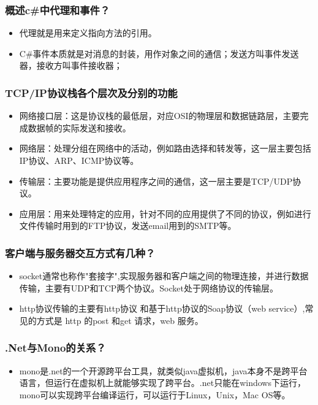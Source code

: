 \documentclass[9pt, b5paper]{article}
\begin{document}
\subsubsection{概述c\#中代理和事件？}
\label{sec:org9d51254}
\begin{itemize}
\item 代理就是用来定义指向方法的引用。
\item C\#事件本质就是对消息的封装，用作对象之间的通信；发送方叫事件发送器，接收方叫事件接收器；
\end{itemize}

\subsubsection{TCP/IP协议栈各个层次及分别的功能}
\label{sec:org0fd1e18}
\begin{itemize}
\item 网络接口层：这是协议栈的最低层，对应OSI的物理层和数据链路层，主要完成数据帧的实际发送和接收。
\item 网络层：处理分组在网络中的活动，例如路由选择和转发等，这一层主要包括IP协议、ARP、ICMP协议等。
\item 传输层：主要功能是提供应用程序之间的通信，这一层主要是TCP/UDP协议。
\item 应用层：用来处理特定的应用，针对不同的应用提供了不同的协议，例如进行文件传输时用到的FTP协议，发送email用到的SMTP等。
\end{itemize}

\subsubsection{客户端与服务器交互方式有几种？}
\label{sec:org80db452}
\begin{itemize}
\item socket通常也称作"套接字",实现服务器和客户端之间的物理连接，并进行数据传输，主要有UDP和TCP两个协议。Socket处于网络协议的传输层。
\item http协议传输的主要有http协议 和基于http协议的Soap协议（web service）,常见的方式是 http 的post 和get 请求，web 服务。
\end{itemize}

\subsubsection{.Net与Mono的关系？}
\label{sec:org9f5bc1f}
\begin{itemize}
\item mono是.net的一个开源跨平台工具，就类似java虚拟机，java本身不是跨平台语言，但运行在虚拟机上就能够实现了跨平台。.net只能在windows下运行，mono可以实现跨平台编译运行，可以运行于Linux，Unix，Mac OS等。
\end{itemize}
\end{document}
